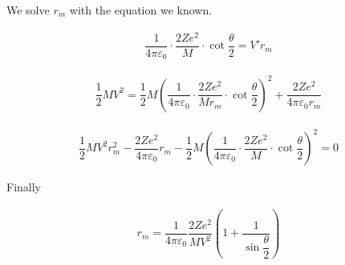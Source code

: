 We solve $r_m$ with the equation we known.

\begin{equation*}
  \begin{aligned}
    \dfrac{1}{4 \pi \varepsilon_0} \cdot \dfrac{2 Z e^2}{M} \cdot \cot \dfrac{\theta}{2} = V' r_m
  \end{aligned}
\end{equation*}

\begin{equation*}
  \begin{aligned}
    \dfrac{1}{2} M V^2 = \dfrac{1}{2} M \left( \dfrac{1}{4 \pi \varepsilon_0} \cdot \dfrac{2 Z e^2}{M r_m} \cdot \cot \dfrac{\theta}{2} \right)^{2} + \dfrac{2 Z e^2}{4 \pi \varepsilon_0 r_m}  
  \end{aligned}
\end{equation*}

\begin{equation*}
  \begin{aligned}
    \dfrac{1}{2} M V^2 r_m^2 - \dfrac{2 Z e^2}{4 \pi \varepsilon_0} r_m - \dfrac{1}{2} M \left( \dfrac{1}{4 \pi \varepsilon_0} \cdot \dfrac{2 Z e^2}{M} \cdot \cot \dfrac{\theta}{2} \right)^{2} = 0
  \end{aligned}
\end{equation*}

Finally

\begin{equation}
  \begin{aligned}
    r_m = \dfrac{1}{4 \pi \varepsilon_0} \dfrac{2 Z e^2}{M V^2} \left( 1 + \dfrac{1}{\sin \dfrac{\theta}{2} }  \right)  
  \end{aligned}
\end{equation}

